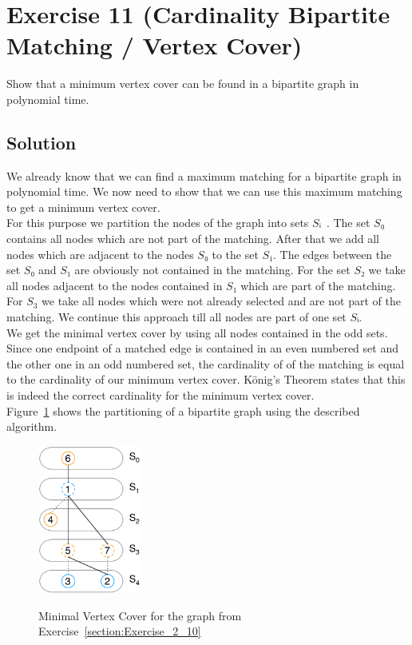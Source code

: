 \documentclass[a4paper, 12pt]{report}
\begin{document}
\section{Exercise 11 (Cardinality Bipartite Matching / Vertex Cover)}

Show that a minimum vertex cover can be found in a bipartite graph in
polynomial time.

\subsection{Solution}

We already know that we can find a maximum matching for a bipartite graph in
polynomial time. We now need to show that we can use this maximum matching to
get a minimum vertex cover.\\

For this purpose we partition the nodes of the graph into sets
$Sᵢ$~\cite{Wikipedia_Koenigs_Theorem}. The set $S₀$ contains all nodes which
are not part of the matching. After that we add all nodes which are adjacent to
the nodes $S₀$ to the set $S₁$. The edges between the set $S₀$ and $S₁$ are
obviously not contained in the matching. For the set $S₂$ we take all nodes
adjacent to the nodes contained in $S₁$ which are part of the matching. For
$S_3$ we take all nodes which were not already selected and are not part of the
matching. We continue this approach till all nodes are part of one set $Sᵢ$.\\

We get the minimal vertex cover by using all nodes contained in the odd sets.
Since one endpoint of a matched edge is contained in an even numbered set and
the other one in an odd numbered set, the cardinality of of the matching is
equal to the cardinality of our minimum vertex cover. König’s Theorem states
that this is indeed the correct cardinality for the minimum vertex cover.\\

Figure~\ref{figure:Exercise_2_11} shows the partitioning of a bipartite graph
using the described algorithm.

\begin{figure}[htbp]
    \caption{Minimal Vertex Cover for the graph from
             Exercise~\ref{section:Exercise_2_10}}
    \vskip 0.2cm
    \centering
    \includegraphics[width=0.3\textwidth]{Figures/Exercise_2_11}
    \label{figure:Exercise_2_11}
\end{figure}
\end{document}
